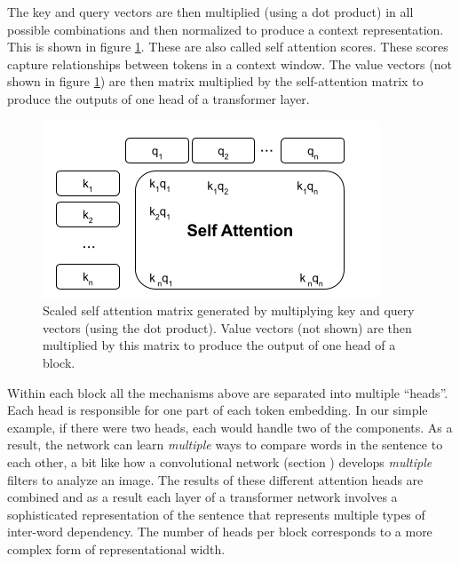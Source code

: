 The key and query vectors are then multiplied (using a dot product) in all possible combinations and then normalized to produce a context representation. This is shown in figure \ref{selfAttention}. These are also called self attention scores. These scores capture relationships between tokens in a context window.  The value vectors (not shown in figure \ref{selfAttention}) are then matrix multiplied by the self-attention matrix to produce the outputs of one head of a transformer layer.

\begin{figure}[h]
\centering
\includegraphics[scale=.6]{./images/selfAttention.png}
\caption[Jeff Yoshimi with consultation from Tim Meyer.]{Scaled self attention matrix generated by multiplying key and query vectors (using the dot product). Value vectors (not shown) are then multiplied by this matrix to produce the output of one head of a block.}
\label{selfAttention}
\end{figure}

Within each block all the mechanisms above are separated into multiple ``heads''.  Each head is responsible for one part of each token embedding. In our simple example, if there were two heads, each would handle two of the components.  As a result, the network can learn \emph{multiple} ways to compare words in the sentence to each other, a bit like how a convolutional network (section ) develops \emph{multiple} filters to analyze an image. The results of these different attention heads are combined and as a result each layer of a transformer network involves a sophisticated representation of the sentence that represents multiple types of inter-word dependency. The number of heads per block corresponds to a more complex form of representational width.

